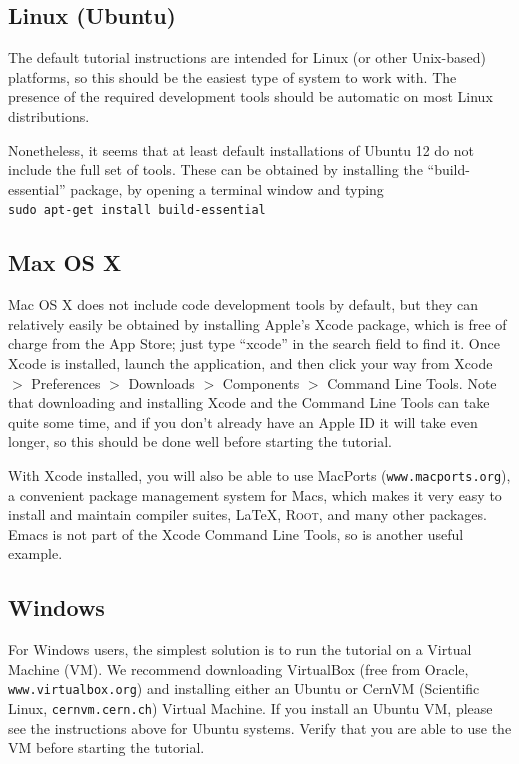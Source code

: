 \documentclass[12pt,a4paper]{article}
\begin{document}
\subsection{Linux (Ubuntu)}

The default tutorial instructions are intended for Linux (or other 
Unix-based) platforms, so this should be the easiest type of system 
to work with. The presence of the required development tools should be
automatic on most Linux distributions. 

Nonetheless, it seems that at least default installations of 
Ubuntu 12 do not include the full set of tools. These can be obtained
by installing the ``build-essential'' package, by opening a terminal
window and typing\\
\hspace*{10mm}\texttt{sudo apt-get install build-essential}

\subsection{Max OS X}

Mac OS X does not include code development tools by default, but they
can relatively easily be obtained by installing Apple's Xcode package,
which is free of charge from the App Store; just type ``xcode'' in the 
search field to find it. Once Xcode is installed, launch the application,
and then click your way from Xcode $>$ Preferences $>$ Downloads $>$
Components $>$ Command Line Tools. Note that downloading and installing
Xcode and the Command Line Tools can take quite some time, and if you
don't already have an Apple ID it will take even longer, so this 
should be done well before starting the tutorial.

With Xcode installed, you will also be able to use MacPorts 
(\texttt{www.macports.org}), a convenient package management system 
for Macs, which makes it very easy to install and maintain compiler 
suites, \LaTeX, \textsc{Root}, and many other packages. Emacs is not
part of the Xcode Command Line Tools, so is another useful example. 

\subsection{Windows}

For Windows users, the simplest solution is to run the tutorial on a
Virtual Machine (VM). We recommend downloading VirtualBox (free from
Oracle, \texttt{www.virtualbox.org}) and installing either an Ubuntu 
or CernVM (Scientific Linux, \texttt{cernvm.cern.ch}) Virtual Machine. 
If you install an Ubuntu VM, please see the instructions above for 
Ubuntu systems. Verify that you are able to use the VM before 
starting the tutorial.
\end{document}
